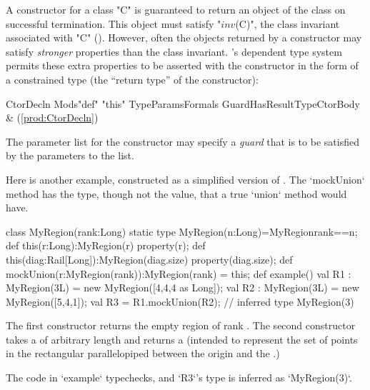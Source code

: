 A constructor for a class \xcd"C" is guaranteed to return an object of the
class on successful termination. This object must satisfy  \xcdmath"$\mathit{inv}$(C)", the
class invariant associated with \xcd"C" ().
However,
often the objects returned by a constructor may satisfy {\em stronger}
properties than the class invariant. \Xten{}'s dependent type system
permits these extra properties to be asserted with the constructor in
the form of a constrained type (the ``return type'' of the constructor):

\begin{bbgrammar}
           CtorDecln \: Mods\opt \xcd"def" \xcd"this" TypeParams\opt Formals Guard\opt HasResultType\opt CtorBody & (\ref{prod:CtorDecln}) \\
\end{bbgrammar}

\label{ConstructorGuard}

The parameter list for the constructor
may specify a \emph{guard} that is to be satisfied by the parameters
to the list.

\begin{ex}
Here is another example, constructed as a simplified 
version of .  The \xcd`mockUnion` method 
has the type, though not the value, that a true \xcd`union` method would have.

\begin{xten}
class MyRegion(rank:Long) {
  static type MyRegion(n:Long)=MyRegion{rank==n};
  def this(r:Long):MyRegion(r) {
    property(r);
  }
  def this(diag:Rail[Long]):MyRegion(diag.size){ 
    property(diag.size);
  }
  def mockUnion(r:MyRegion(rank)):MyRegion(rank) = this;
  def example() {
    val R1 : MyRegion(3L) = new MyRegion([4,4,4 as Long]); 
    val R2 : MyRegion(3L) = new MyRegion([5,4,1]); 
    val R3 = R1.mockUnion(R2); // inferred type MyRegion(3)
  }
}
\end{xten}
%
The first constructor returns the empty region of rank .  The
second constructor takes a  of arbitrary length
 and returns a  (intended to represent the set
of points in the rectangular parallelopiped between the origin and the
.)

The code in \xcd`example` typechecks, and \xcd`R3`'s type is inferred as
\xcd`MyRegion(3)`.  


\end{ex}

